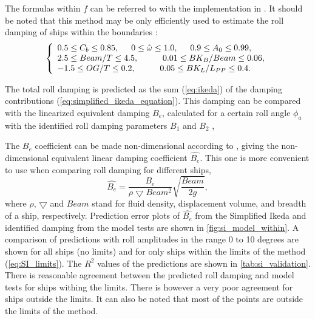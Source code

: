 \noindent The formulas within $f$ can be referred to \parencite{ikeda_velocity_1979, kawahara_simple_2011} with the implementation in \cite{alexandersson_martinlarsalbertrolldecay-estimators_2020}.
It should be noted that this method may be only efficiently used to estimate the roll damping of ships within the boundaries \parencite{kawahara_simple_2011}:
\begin{equation}
    \label{eq:SI_limits}
     \left\{
     \begin{array}{ll}
    0.5 \leq C_b \leq 0.85,\hspace{0.5cm} 
    0 \leq \hat{\omega} \leq 1.0,
    \hspace{0.5cm}
    0.9 \leq A_0 \leq 0.99,\\
    2.5\leq Beam/T \leq 4.5, \hspace{1cm}
    0.01 \leq BK_B/Beam \leq 0.06, \\
        -1.5 \leq OG/T \leq 0.2,
     \hspace{1cm}
    0.05 \leq BK_L/L_{PP} \leq 0.4.
    \end{array}
    \right.
\end{equation}

\noindent The total roll damping is predicted as the sum (\autoref{eq:ikeda}) of the damping contributions (\autoref{eq:simplified_ikeda_equation}). This damping can be compared with the linearized equivalent damping $B_e$, calculated for a certain roll angle $\phi_a$ with the identified roll damping parameters $B_1$ and $B_2$ \cite{himeno_prediction_1981},


\noindent The $B_e$ coefficient can be made non-dimensional according to \parencite{himeno_prediction_1981}, giving the non-dimensional equivalent linear damping coefficient $\hat{B_e}$. This one is more convenient to use when comparing roll damping for different ships,
\begin{equation} \label{eq:be_eqvalent}
    \hat{B_e} = \frac{B_e}{\rho \bigtriangledown Beam^2} \sqrt{\frac{Beam}{2g}},
\end{equation}
\noindent where $\rho$, $\bigtriangledown$ and $Beam$ stand for fluid density, displacement volume, and breadth of a ship, respectively. Prediction error plots of $\hat{B_e}$ from the Simplified Ikeda and identified damping from the model tests are shown in \autoref{fig:si_model_within}. A comparison of predictions with roll amplitudes in the range 0 to 10 degrees are shown for all ships (no limits) and for only ships within the limits of the method (\autoref{eq:SI_limits}). The $R^2$ values of the predictions are shown in \autoref{tab:si_validation}. There is reasonable agreement between the predicted roll damping and model tests for ships withing the limits. There is however a very poor agreement for ships outside the limits. It can also be noted that most of the points are outside the limits of the method.

